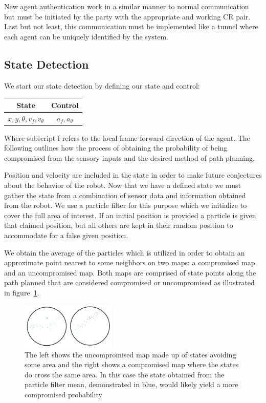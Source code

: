 \documentclass[conference]{IEEEtran}
\begin{document}
New agent authentication work in a similar manner to normal communication but must be initiated by the party with the appropriate and working CR pair. Last but not least, this communication must be implemented like a tunnel where each agent can be uniquely identified by the system.

\subsection{State Detection}

We start our state detection by defining our state and control:

\begin{table}[]
\label{table_example}
\begin{center}
\begin{tabular}{|c|c|}
\hline
State & Control\\
\hline
$x,y,\theta,v_f,v_\theta$ & $a_f,a_\theta$\\
\hline
\end{tabular}
\end{center}
\end{table}

Where subscript f refers to the local frame forward direction of the agent. The following outlines how the process of obtaining the probability of being compromised from the sensory inputs and the desired method of path planning.

Position and velocity are included in the state in order to make future conjectures about the behavior of the robot. Now that we have a defined state we must gather the state from a combination of sensor data and information obtained from the robot. We use a particle filter for this purpose which we initialize to cover the full area of interest. If an initial position is provided a particle is given that claimed position, but all others are kept in their random position to accommodate for a false given position.
	
We obtain the average of the particles  which is utilized in order to obtain an approximate point nearest to some neighbors on two maps: a compromised map and an uncompromised map. Both maps are comprised of state points along the path planned that are considered compromised or uncompromised as illustrated in figure~\ref{fig:compmaps}.
	
\begin{figure}[]
\centering
\includegraphics[width=0.4\textwidth]{Path_comp_uncomp}
\caption{The left shows the uncompromised map made up of states avoiding some area and the right shows a compromised map where the states do cross the same area. In this case the state obtained from the particle filter mean, demonstrated in blue, would likely yield a more compromised probability}
\label{fig:compmaps}
\end{figure}
	
\end{document}
